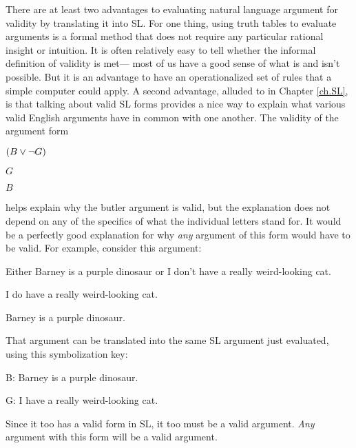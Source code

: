 There are at least two advantages to evaluating natural language argument for validity by translating it into SL. For one thing, using truth tables to evaluate arguments is a formal method that does not require any particular rational insight or intuition. It is often relatively easy to tell whether the informal definition of validity is met--- most of us have a good sense of what is and isn't possible. But it is an advantage to have an operationalized set of rules that a simple computer could apply. A second advantage, alluded to in Chapter \ref{ch.SL}, is that talking about valid SL forms provides a nice way to explain what various valid English arguments have in common with one another. The validity of the argument form

\begin{earg}
\item $(B\vee\neg G)$
\item $G$
\item[\therefore] $B$
\end{earg}

helps explain why the butler argument is valid, but the explanation does not depend on any of the specifics of what the individual letters stand for. It would be a perfectly good explanation for why \emph{any} argument of this form would have to be valid. For example, consider this argument:

\begin{earg}
\item Either Barney is a purple dinosaur or I don't have a really weird-looking cat.
\item I do have a really weird-looking cat.
\item[\therefore] Barney is a purple dinosaur.
\end{earg}

That argument can be translated into the same SL argument just evaluated, using this symbolization key:

\begin{ekey}
\item[B:] Barney is a purple dinosaur.
\item[G:] I have a really weird-looking cat.
\end{ekey}

Since it too has a valid form in SL, it too must be a valid argument. \emph{Any} argument with this form will be a valid argument.


